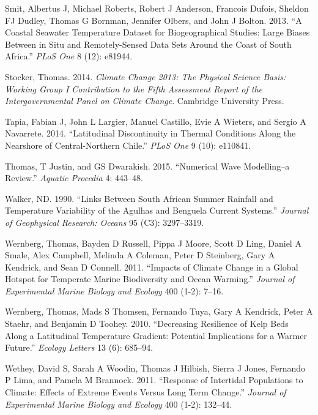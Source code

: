 \documentclass[12pt,a4paper,]{article}
\begin{document}
\leavevmode\hypertarget{ref-Smit2013}{}%
Smit, Albertus J, Michael Roberts, Robert J Anderson, Francois Dufois,
Sheldon FJ Dudley, Thomas G Bornman, Jennifer Olbers, and John J Bolton.
2013. ``A Coastal Seawater Temperature Dataset for Biogeographical
Studies: Large Biases Between in Situ and Remotely-Sensed Data Sets
Around the Coast of South Africa.'' \emph{PLoS One} 8 (12): e81944.

\leavevmode\hypertarget{ref-Stocker2014}{}%
Stocker, Thomas. 2014. \emph{Climate Change 2013: The Physical Science
Basis: Working Group I Contribution to the Fifth Assessment Report of
the Intergovernmental Panel on Climate Change}. Cambridge University
Press.

\leavevmode\hypertarget{ref-Tapia2014}{}%
Tapia, Fabian J, John L Largier, Manuel Castillo, Evie A Wieters, and
Sergio A Navarrete. 2014. ``Latitudinal Discontinuity in Thermal
Conditions Along the Nearshore of Central-Northern Chile.'' \emph{PLoS
One} 9 (10): e110841.

\leavevmode\hypertarget{ref-Thomas2015}{}%
Thomas, T Justin, and GS Dwarakish. 2015. ``Numerical Wave Modelling--a
Review.'' \emph{Aquatic Procedia} 4: 443--48.

\leavevmode\hypertarget{ref-Walker1990}{}%
Walker, ND. 1990. ``Links Between South African Summer Rainfall and
Temperature Variability of the Agulhas and Benguela Current Systems.''
\emph{Journal of Geophysical Research: Oceans} 95 (C3): 3297--3319.

\leavevmode\hypertarget{ref-Wernberg2011}{}%
Wernberg, Thomas, Bayden D Russell, Pippa J Moore, Scott D Ling, Daniel
A Smale, Alex Campbell, Melinda A Coleman, Peter D Steinberg, Gary A
Kendrick, and Sean D Connell. 2011. ``Impacts of Climate Change in a
Global Hotspot for Temperate Marine Biodiversity and Ocean Warming.''
\emph{Journal of Experimental Marine Biology and Ecology} 400 (1-2):
7--16.

\leavevmode\hypertarget{ref-Wernberg2010}{}%
Wernberg, Thomas, Mads S Thomsen, Fernando Tuya, Gary A Kendrick, Peter
A Staehr, and Benjamin D Toohey. 2010. ``Decreasing Resilience of Kelp
Beds Along a Latitudinal Temperature Gradient: Potential Implications
for a Warmer Future.'' \emph{Ecology Letters} 13 (6): 685--94.

\leavevmode\hypertarget{ref-Wethey2011}{}%
Wethey, David S, Sarah A Woodin, Thomas J Hilbish, Sierra J Jones,
Fernando P Lima, and Pamela M Brannock. 2011. ``Response of Intertidal
Populations to Climate: Effects of Extreme Events Versus Long Term
Change.'' \emph{Journal of Experimental Marine Biology and Ecology} 400
(1-2): 132--44.
\end{document}
